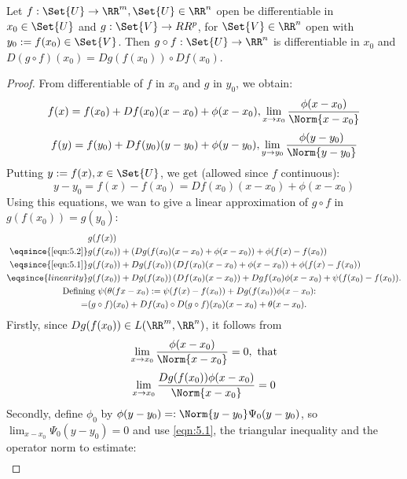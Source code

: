 \begin{thm}
  Let $f:\Set{U}\to\RR^m, \Set{U}\in\RR^n$ open be differentiable in $x_0\in \Set{U}$ and $g:\Set{V}\to RR^p$, for $\Set{V}\in \RR^n$ open with $y_0:=f(x_0)\in \Set{V}$. Then $g\circ f: \Set{U}\to \RR^n$ is differentiable in $x_0$ and $D(g\circ f)(x_0)=Dg(f(x_0))\circ Df(x_0)$.
\end{thm}
\begin{proof}
  From differentiable of $f$ in $x_0$ and $g$ in $y_0$, we obtain: 
  \begin{equation}
  	\label{eqn:5.1}
  	f(x)=f(x_0)+Df(x_0)(x-x_0)+\phi(x-x_0), \lim_{x\to x_0}\frac{\phi(x-x_0)}{\Norm{x-x_0}}
  \end{equation}
  \begin{equation}
  \label{eqn:5.2}
  f(y)=f(y_0)+Df(y_0)(y-y_0)+\phi(y-y_0), \lim_{y\to y_0}\frac{\phi(y-y_0)}{\Norm{y-y_0}}
  \end{equation}
  Putting $y:=f(x), x\in\Set{U}$, we get (allowed since $f$ continuous):
  \begin{equation}
  \label{eqn:5.3}
  y-y_0=f(x)-f(x_0)=Df(x_0)(x-x_0)+\phi(x-x_0)
  \end{equation}
  Using this equations, we wan to give a linear approximation of $g\circ f$ in $g(f(x_0))=g(y_0)$: 
  \begin{align*}
  	&g(f(x))\\
  	\eqsince{\eqref{eqn:5.2}}&g(f(x_0))+\left(Dg(f(x_0)(x-x_0)+\phi(x-x_0)\right)+\phi(f(x)-f(x_0))\\
  	\eqsince{\eqref{eqn:5.1}}&g(f(x_0))+Dg(f(x_0))\left(Df(x_0)(x-x_0)+\phi(x-x_0)\right)+\phi(f(x)-f(x_0))\\
  	\eqsince{linearity}&g(f(x_0))+Dg(f(x_0))\left(Df(x_0)(x-x_0)\right)+Dg f(x_0)\phi(x-x_0)+\psi(f(x_0)-f(x_0)). \\ &\text{\hspace{-1cm}Defining $\psi(\theta(fx-x_0):=\psi(f(x)-f(x_0))+Dg(f(x_0))\phi(x-x_0)$:}\\
  	=&(g\circ f)(x_0)+Df(x_0)\circ D(g\circ f)(x_0)(x-x_0)+\theta(x-x_0).
  \end{align*}
  Firstly, since $Dg(f(x_0))\in L(\RR^m,\RR^n)$, it follows from \[\lim_{x\to x_0}\frac{\phi(x-x_0)}{\Norm{x-x_0}}=0, \text{ that}\]
  \[\lim_{x\to x_0}\frac{Dg(f(x_0))\phi(x-x_0)}{\Norm{x-x_0}}=0\]
  Secondly, define $\phi_0$ by $\phi(y-y_0)=:\Norm{y-y_0}\Psi_0(y-y_0)$, so $\lim_{x-x_0}\Psi_0(y-y_0)=0$ and use \eqref{eqn:5.1}, the triangular inequality and the operator norm to estimate:
  \begin{align*}

\end{align*}
\end{proof}
